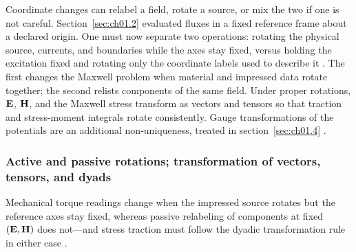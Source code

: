 Coordinate changes can relabel a field, rotate a source, or mix the two if one is not careful. Section~\ref{sec:ch01.2} evaluated fluxes in a fixed reference frame about a declared origin. One must now separate two operations: rotating the physical source, currents, and boundaries while the axes stay fixed, versus holding the excitation fixed and rotating only the coordinate labels used to describe it \cite{stratton1941,hansen1988}. The first changes the Maxwell problem when material and impressed data rotate together; the second relists components of the same field. Under proper rotations, $\mathbf{E}$, $\mathbf{H}$, and the Maxwell stress transform as vectors and tensors so that traction and stress-moment integrals rotate consistently. Gauge transformations of the potentials are an additional non-uniqueness, treated in section~\ref{sec:ch01.4} \cite{belinfante1940,maxwell1873}.

\label{sec:ch01.3.1}

\subsubsection*{Active and passive rotations; transformation of vectors, tensors, and dyads}

Mechanical torque readings change when the impressed source rotates but the reference axes stay fixed, whereas passive relabeling of components at fixed $(\mathbf{E},\mathbf{H})$ does not---and stress traction must follow the dyadic transformation rule in either case \cite{beth1936,stratton1941}.

